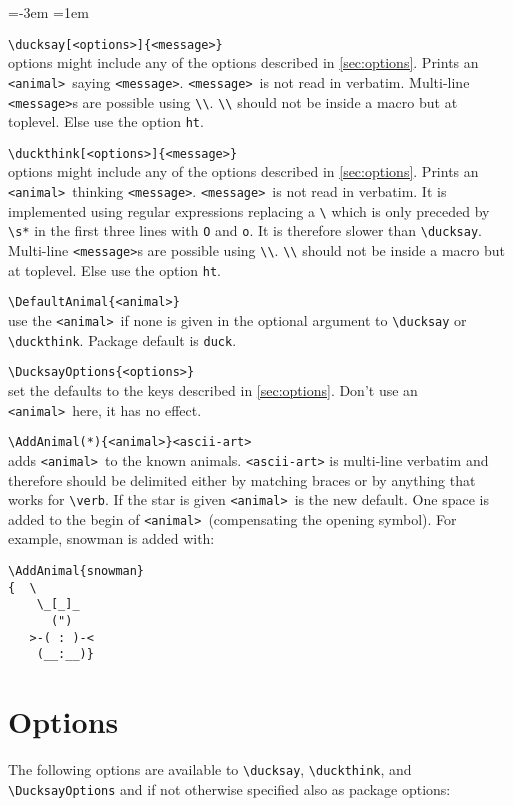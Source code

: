 \documentclass[a4paper,10pt]{article}
\newcommand*{\anml}{\texttt{<animal>}}
\newcommand*{\msg}{\texttt{<message>}}
\newenvironment{codedescription}{%
  \parindent=-3em
  \parskip=1em
  \par
}{}
\begin{document}
\begin{codedescription}
\verb|\ducksay[<options>]{<message>}|\\
  options might include any of the options described in
  \autoref{sec:options}. Prints an \anml\ saying \msg. \msg\ is not read in
  verbatim. Multi-line \msg s are possible using \verb|\\|. \verb|\\| should not
  be inside a macro but at toplevel. Else use the option \texttt{ht}.

\verb|\duckthink[<options>]{<message>}|\\
  options might include any of the options described in
  \autoref{sec:options}. Prints an \anml\ thinking \msg. \msg\ is not read in
  verbatim. It is implemented using regular expressions replacing a \verb|\|
  which is only preceded by \verb|\s*| in the first three lines with \verb|O|
  and \verb|o|. It is therefore slower than \verb|\ducksay|. Multi-line \msg s
  are possible using \verb|\\|. \verb|\\| should not be inside a macro but at
  toplevel. Else use the option \texttt{ht}.

\verb|\DefaultAnimal{<animal>}|\\
  use the \anml\ if none is given in the optional argument to \verb|\ducksay| or
  \verb|\duckthink|. Package default is \texttt{duck}.

\verb|\DucksayOptions{<options>}|\\
  set the defaults to the keys described in \autoref{sec:options}. Don't use an
  \anml\ here, it has no effect.

\verb|\AddAnimal(*){<animal>}<ascii-art>|\\
  adds \anml\ to the known animals. \texttt{<ascii-art>} is multi-line verbatim
  and therefore should be delimited either by matching braces or by anything
  that works for \verb|\verb|. If the star is given \anml\ is the new default.
  One space is added to the begin of \anml\ (compensating the opening symbol).
  For example, snowman is added with:\\[1ex]
  \begin{minipage}{\linewidth}
\begin{verbatim}
\AddAnimal{snowman}
{  \
    \_[_]_
      (")
   >-( : )-<
    (__:__)}
\end{verbatim}
  \end{minipage}
\end{codedescription}
\section{Options}\label{sec:options}%
{\reversemarginpar{}}
The following options are available to \verb|\ducksay|, \verb|\duckthink|, and
\verb|\DucksayOptions| and if not otherwise specified also as package options:
\end{document}
